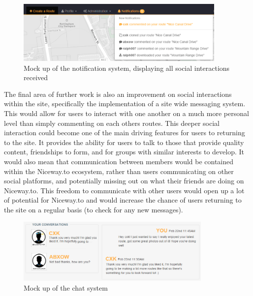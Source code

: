 \begin{figure}[!ht]
	\begin{center}
		\includegraphics[width=0.9125\textwidth]{images/further/notification.png}
	\end{center}
	\vspace{-6mm}
	\caption{Mock up of the notification system, displaying all social interactions received}	
\end{figure}

\noindent 
The final area of further work is also an improvement on social interactions within the site, specifically the implementation of a site wide messaging system. This would allow for users to interact with one another on a much more personal level than simply commenting on each others routes. This deeper social interaction could become one of the main driving features for users to returning to the site. It provides the ability for users to talk to those that provide quality content, friendships to form, and for groups with similar interests to develop. It would also mean that communication between members would be contained within the Niceway.to ecosystem, rather than users communicating on other social platforms, and potentially missing out on what their friends are doing on Niceway.to. This freedom to communicate with other users would open up a lot of potential for Niceway.to and would increase the chance of users returning to the site on a regular basis (to check for any new messages).

\begin{figure}[!ht]
	\begin{center}
		\includegraphics[width=0.85\textwidth]{images/further/chat.png}
	\end{center}
	\vspace{-6mm}
	\caption{Mock up of the chat system}	
	\vspace{-10mm}
\end{figure}

